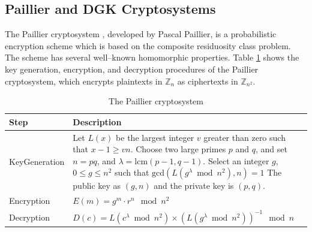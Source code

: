 \subsection{Paillier and DGK Cryptosystems}
The Paillier cryptosystem \cite{stern_public-key_1999}, developed by Pascal Paillier, is a probabilistic encryption scheme which is based on the composite residuosity class problem. The scheme has several well--known homomorphic properties.
Table \ref{tab:paillier_summary} shows the key generation, encryption, and decryption procedures of the Paillier cryptosystem, which encrypts plaintexts in $\mathbb{Z}_n$ as ciphertexts in $\mathbb{Z}_{n^2}$.
\begin{table}[ht]
	\caption{The Paillier cryptosystem}
	\label{tab:paillier_summary}
    \begin{tabular}{
        p{}
        p{}}
		\toprule
		Step & Description\\
        \midrule
            Key\newline Generation &
            Let $L(x)$ be the largest integer $v$ greater than zero such that $x-1 \geq vn$.\newline
            Choose two large primes $p$ and $q$, and set $n = pq$, and $ \lambda = \mathrm{lcm}(p-1,q-1)$.\newline
            Select an integer $g$, $0\leq g \leq n^2$ such that $\mathrm{gcd}(L(g^\lambda \bmod n^2), n) = 1$\newline
            The public key as $(g,n)$ and the private key is $(p,q)$.
            \\
            Encryption &
            $E(m) = g^m \cdot r^n \mod{n^2}$ 
            \\
            Decryption &
            $D(c) = L(c^\lambda \bmod n^2) \times (L(g^\lambda \bmod n^2))^{-1} \mod n$ 
            \\
	    \bottomrule
    \end{tabular}
\end{table}


